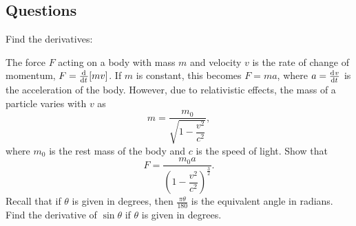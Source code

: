 \subsection*{Questions}
\begin{questions}
  \question Find the derivatives:
  \question The force $ F $ acting on a body with mass $ m $ and velocity $ v $ is the rate
            of change of momentum, $ F = \od{}{t} [mv] $. If $ m $ is constant, this becomes $ F = ma $,
            where $ a = \od{v}{t} $ is the acceleration of the body. However, due to relativistic
            effects, the mass of a particle varies with $ v $ as
            \begin{displaymath}
              m = \frac{m_0}{\sqrt{1 - \dfrac{v^2}{c^2}}},
            \end{displaymath}
            where $ m_0 $ is the rest mass of the body and $ c $ is the speed of light. Show that
            \begin{displaymath}
              F = \frac{m_0 a}{\left(1 - \dfrac{v^2}{c^2}\right)^{\frac{3}{2}}}.
            \end{displaymath}
  \question Recall that if $ \theta $ is given in degrees, then $ \frac{\pi \theta}{180} $ is the equivalent angle in radians.
            Find the derivative of $ \sin \theta $ if $ \theta $ is given in degrees.
\end{questions}

